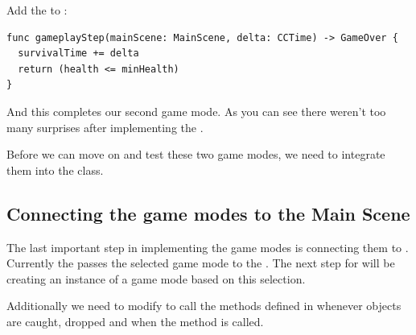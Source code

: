 \begin{leftbar}
Add the  to :
\begin{lstlisting}
func gameplayStep(mainScene: MainScene, delta: CCTime) -> GameOver {
  survivalTime += delta
  return (health <= minHealth)
}
\end{lstlisting}
\end{leftbar}
And this completes our second game mode. As you can see there weren't too many
surprises after implementing the .

Before we can move on and test these two game modes, we need to
integrate them into the  class.

\subsection{Connecting the game modes to the Main Scene}
The last important step in implementing the game modes is connecting them to
. Currently the  passes the
selected game mode to the . The next step for 
 will be creating an instance of a game mode based on this
selection.

Additionally we need to modify  to call the methods
defined in  whenever objects are caught, dropped
and when the  method is called.

